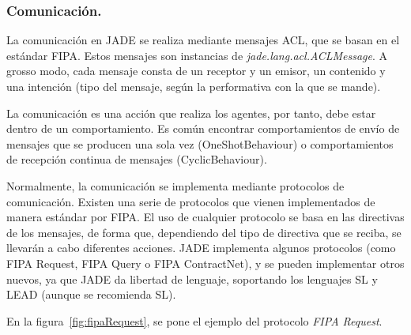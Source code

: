 \subsubsection{Comunicación.}

La comunicación en JADE se realiza mediante mensajes ACL, que se basan en el estándar FIPA. Estos mensajes son instancias de \emph{jade.lang.acl.\-ACLMessage}. A grosso modo, cada mensaje consta de un receptor y un emisor, un contenido y una intención (tipo del mensaje, según la performativa con la que se mande).

La comunicación es una acción que realiza los agentes, por tanto, debe estar dentro de un comportamiento. Es común encontrar comportamientos de envío de mensajes que se producen una sola vez (OneShotBehaviour) o comportamientos de recepción continua de mensajes (CyclicBehaviour).

Normalmente, la comunicación se implementa mediante protocolos de comunicación. Existen una serie de protocolos que vienen implementados de manera estándar por FIPA. El uso de cualquier protocolo se basa en las directivas de los mensajes, de forma que, dependiendo del tipo de directiva que se reciba, se llevarán a cabo diferentes acciones. JADE implementa algunos protocolos (como FIPA Request, FIPA Query o FIPA ContractNet), y se pueden implementar otros nuevos, ya que JADE da libertad de lenguaje, soportando los lenguajes SL y LEAD (aunque se recomienda SL).

En la figura~\ref{fig:fipaRequest}, se pone el ejemplo del protocolo \emph{FIPA Request}.


